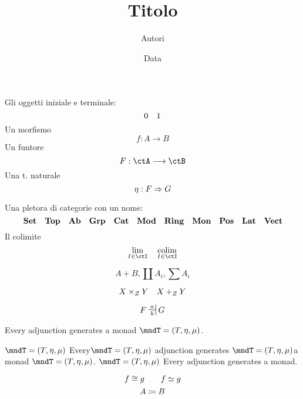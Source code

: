 \documentclass[ paper=a4
              , pagesize
              , fontsize=12pt
              , twoside=true
              , BCOR=5mm
              , DIV=calc
              , bibliography=totoc
              , final
              , version=last
              ]{scrbook}
\begin{document}
\frontmatter

\title{Titolo}
\author{Autori}
\date{Data}
\publishers{Casa editrice}
\uppertitleback{Dettagli pubblicazione I}
\lowertitleback{Dettagli pubblicazione II}
\dedication{Dedica}

\maketitle

\tableofcontents

\mainmatter

\Blinddocument
\blindmathpaper

\chapter{}
Gli oggetti iniziale e terminale:
\[\init\quad\term\]
Un morfismo
\[f : A \to B\]
Un funtore
\[F : \ctA \fun \ctB\]
Una t. naturale
\[\eta : F \nat G\]

Una pletora di categorie con un nome:
\[
	\ctSet\quad
	\ctTop\quad
	\ctAb\quad
	\ctGrp\quad
	\ctCat\quad
	\ctMod\quad
	\ctRing\quad
	\ctMon\quad
	\ctPos\quad
	\ctLat\quad
	\ctVect\]
Il colimite
\[\lim_{I\in\ctI} \quad \colim_{I\in\ctI}\]


\[A + B, \coprod A_i, \sum A_i\]

\[\pull{X}{Y}{Z} \quad \push{X}{Y}{Z}\]

\[F\adjunct[a][b] G\]

Every adjunction generates a monad \(\mndT = (T, \eta,\mu)\).

\(\mndT = (T, \eta,\mu)\) Every\(\mndT = (T, \eta,\mu)\) adjunction generates \(\mndT = (T, \eta,\mu)\)a monad \(\mndT = (T, \eta,\mu)\).
\(\mndT = (T, \eta,\mu)\) Every adjunction generates a monad.

\[f \iso g\qquad f \eqv g\]
\[A \defeq B\]
\clearpage
\appendix


\backmatter
\end{document}
